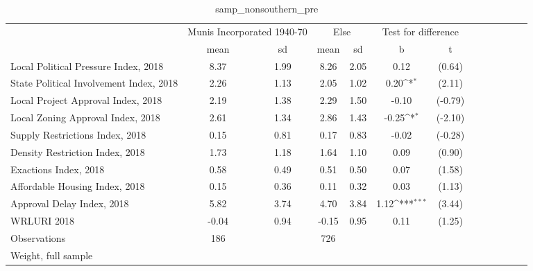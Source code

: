 \begin{table}[htbp]\centering
\def\sym#1{\ifmmode^{#1}\else\(^{#1}\)\fi}
\caption{samp\_nonsouthern\_pre \label{tab1}}
\begin{tabular}{l*{3}{cccc}}
\toprule
                    &\multicolumn{2}{c}{Munis Incorporated 1940-70}&\multicolumn{2}{c}{Else} &\multicolumn{2}{c}{Test for difference}\\
                    &        mean&          sd&        mean&          sd&           b         &           t\\
\midrule
Local Political Pressure Index, 2018&        8.37&        1.99&        8.26&        2.05&        0.12         &      (0.64)\\
State Political Involvement Index, 2018&        2.26&        1.13&        2.05&        1.02&        0.20\sym{*}  &      (2.11)\\
Local Project Approval Index, 2018&        2.19&        1.38&        2.29&        1.50&       -0.10         &     (-0.79)\\
Local Zoning Approval Index, 2018&        2.61&        1.34&        2.86&        1.43&       -0.25\sym{*}  &     (-2.10)\\
Supply Restrictions Index, 2018&        0.15&        0.81&        0.17&        0.83&       -0.02         &     (-0.28)\\
Density Restriction Index, 2018&        1.73&        1.18&        1.64&        1.10&        0.09         &      (0.90)\\
Exactions Index, 2018&        0.58&        0.49&        0.51&        0.50&        0.07         &      (1.58)\\
Affordable Housing Index, 2018&        0.15&        0.36&        0.11&        0.32&        0.03         &      (1.13)\\
Approval Delay Index, 2018&        5.82&        3.74&        4.70&        3.84&        1.12\sym{***}&      (3.44)\\
WRLURI 2018         &       -0.04&        0.94&       -0.15&        0.95&        0.11         &      (1.25)\\
\midrule
Observations        &         186&            &         726&            &                     &            \\
\bottomrule
\multicolumn{7}{l}{\footnotesize Weight, full sample}\\
\end{tabular}
\end{table}
